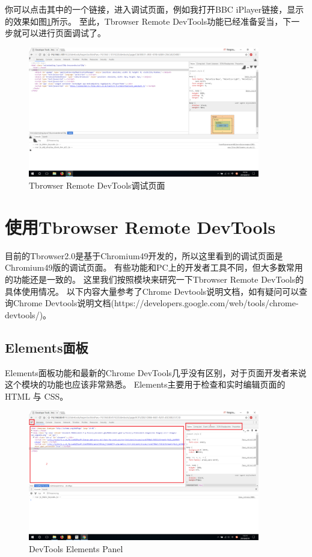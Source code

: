 你可以点击其中的一个链接，进入调试页面，例如我打开BBC iPlayer链接，显示的效果如图\ref{fig:debug_page}所示。
至此，Tbrowser Remote DevTools功能已经准备妥当，下一步就可以进行页面调试了。
\begin{figure}[H] 
\centering 
\includegraphics[width=0.9\textwidth]{image/devtools_study/debug_page.png} 
\caption{Tbrowser Remote DevTools调试页面} \label{fig:debug_page} 
\end{figure}

\section{使用Tbrowser Remote DevTools}
目前的Tbrowser2.0是基于Chromium49开发的，所以这里看到的调试页面是Chromium49版的调试页面。
有些功能和PC上的开发者工具不同，但大多数常用的功能还是一致的。
这里我们按照模块来研究一下Tbrowser Remote DevTools的具体使用情况。
以下内容大量参考了Chrome Devtools说明文档，如有疑问可以查询Chrome Devtools说明文档(https://developers.google.com/web/tools/chrome-devtools/)。

\subsection{Elements面板}
Elements面板功能和最新的Chrome DevTools几乎没有区别，对于页面开发者来说这个模块的功能也应该非常熟悉。
Elements主要用于检查和实时编辑页面的 HTML 与 CSS。

\begin{figure}[H] 
\centering 
\includegraphics[width=0.9\textwidth]{image/devtools_study/elements_panel.png} 
\caption{DevTools Elements Panel} \label{fig:elements_panel} 
\end{figure}


